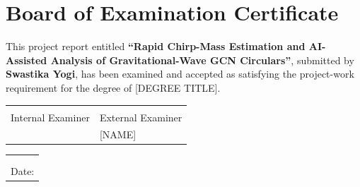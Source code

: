 \chapter*{Board of Examination Certificate}

This project report entitled \textbf{``Rapid Chirp-Mass Estimation and AI-Assisted Analysis of Gravitational-Wave GCN Circulars''}, submitted by \textbf{Swastika Yogi}, %
has been examined and accepted as satisfying the project-work requirement for the degree of [DEGREE TITLE]. %

\vspace{2cm}
\noindent
\begin{tabular}{@{}ll}
\hrulefill & \hrulefill \\
Internal Examiner & External Examiner \\ %
[NAME] & [NAME] \\ %
\end{tabular}

\vspace{1cm}
\noindent
\begin{tabular}{@{}l}
\hrulefill \\
[PROGRAM COORDINATOR / HOD] \\ %
Date: \underline{\hspace{4cm}}
\end{tabular}
